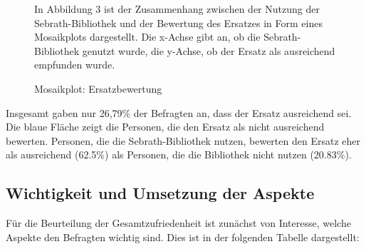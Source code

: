 \documentclass[11pt, a4paper]{article}
\begin{document}
	\begin{figure}[h]
			\vspace{-0.8cm}
			In Abbildung 3 ist der Zusammenhang zwischen der Nutzung der Sebrath-Bibliothek und der Bewertung des Ersatzes in Form eines Mosaikplots dargestellt. Die x-Achse gibt an, ob die Sebrath-Bibliothek genutzt wurde, die y-Achse, ob der Ersatz als ausreichend empfunden wurde.
				\vspace{-5cm}
	\end{figure}
	\newpage
	\begin{figure}[h]
	 \begin{center}
	{\centering } \end{center}
	\vspace{-1cm}
	\caption{Mosaikplot: Ersatzbewertung}
\end{figure}
Insgesamt gaben nur 26,79\% der Befragten an, dass der Ersatz ausreichend sei. Die blaue Fläche zeigt die Personen, die den Ersatz als nicht ausreichend bewerten. Personen, die die Sebrath-Bibliothek nutzen, bewerten den Ersatz eher als ausreichend (62.5\%) als Personen, die die Bibliothek nicht nutzen (20.83\%).

\subsection{Wichtigkeit und Umsetzung der Aspekte}
Für die Beurteilung der Gesamtzufriedenheit ist zunächst von Interesse, welche Aspekte den Befragten wichtig sind. Dies ist in der folgenden Tabelle dargestellt:
\end{document}

